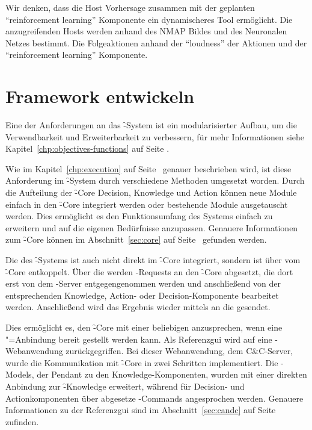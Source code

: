 Wir denken, dass die Host Vorhersage zusammen mit der geplanten
\enquote{reinforcement learning} Komponente ein dynamischeres Tool
ermöglicht. Die anzugreifenden Hosts werden anhand des NMAP Bildes und
des Neuronalen Netzes bestimmt. Die Folgeaktionen anhand der
\enquote{loudness} der Aktionen und der \enquote{reinforcement learning}
Komponente.


\section{Framework entwickeln}

Eine der Anforderungen an das \f-System ist ein modularisierter Aufbau,
um die Verwendbarkeit und Erweiterbarkeit zu verbessern, für mehr
Informationen siehe Kapitel~\ref{chp:objectives-functions} auf Seite
\pageref{chp:objectives-functions}.

Wie im Kapitel~\ref{chp:execution} auf Seite~\pageref{chp:execution} genauer
beschrieben wird, ist diese Anforderung im \f-System durch verschiedene
Methoden umgesetzt worden. Durch die Aufteilung der \f-Core Decision,
Knowledge und Action können neue Module einfach in den \f-Core integriert
werden oder bestehende Module ausgetauscht werden. Dies ermöglicht
es den Funktionsumfang des Systems einfach zu erweitern und auf die eigenen
Bedürfnisse anzupassen. Genauere Informationen zum \f-Core können im
Abschnitt~\ref{sec:core} auf Seite~\pageref{sec:core} gefunden werden.

Die  des \f-Systems ist auch nicht direkt im \f-Core integriert,
sondern ist über  vom \f-Core entkoppelt. Über die 
werden -Requests an den \f-Core abgesetzt, die dort erst von dem
-Server entgegengenommen werden und anschließend von der
entsprechenden Knowledge, Action- oder Decision-Komponente bearbeitet werden.
Anschließend wird das Ergebnis wieder mittels  an die 
gesendet.

Dies ermöglicht es, den \f-Core mit einer beliebigen 
anzusprechen, wenn eine "=Anbindung bereit gestellt werden kann.
Als Referenzgui wird auf eine -Webanwendung
zurückgegriffen. Bei dieser Webanwendung, dem C\&C-Server, wurde die
Kommunikation mit \f-Core in zwei Schritten implementiert. Die
-Models, der Pendant zu den Knowledge-Komponenten,
wurden mit einer direkten Anbindung zur \f-Knowledge erweitert,
während für Decision- und Actionkomponenten über abgesetze
-Commands angesprochen werden. Genauere Informationen zu
der Referenzgui sind im Abschnitt~\ref{sec:candc} auf
Seite~\pageref{sec:candc} zufinden. 

